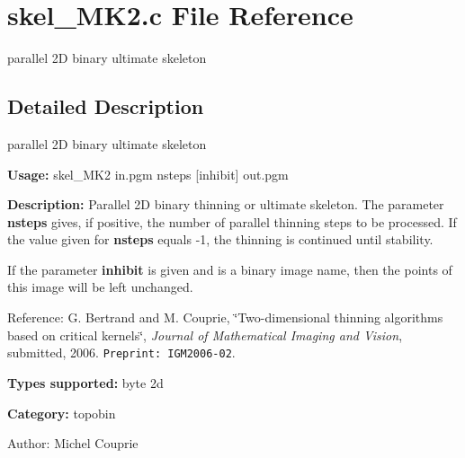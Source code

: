 \section{skel\_\-MK2.c File Reference}
\label{skel__MK2_8c}
parallel 2D binary ultimate skeleton 



\subsection{Detailed Description}
parallel 2D binary ultimate skeleton 

{\bf Usage:} skel\_\-MK2 in.pgm nsteps [inhibit] out.pgm

{\bf Description:} Parallel 2D binary thinning or ultimate skeleton. The parameter {\bf nsteps} gives, if positive, the number of parallel thinning steps to be processed. If the value given for {\bf nsteps} equals -1, the thinning is continued until stability.

If the parameter {\bf inhibit} is given and is a binary image name, then the points of this image will be left unchanged.

Reference: G. Bertrand and M. Couprie, \char`\"{}Two-dimensional thinning algorithms based on critical kernels\char`\"{}, {\em  Journal of Mathematical Imaging and Vision\/}, submitted, 2006. {\tt Preprint: IGM2006-02}.

{\bf Types supported:} byte 2d

{\bf Category:} topobin

\begin{Desc}
\item[Author:]Michel Couprie \end{Desc}
